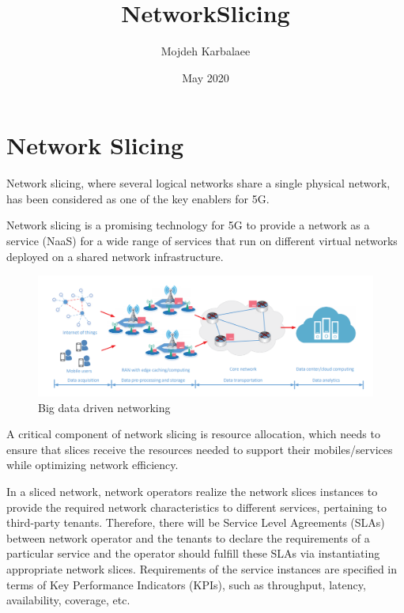 \documentclass{article}
\title{NetworkSlicing}
\author{Mojdeh Karbalaee}
\date{May 2020}
\begin{document}
\maketitle

\section{Network Slicing}
Network slicing, where several logical
networks share a single physical network, has been considered as one of
the key enablers for 5G. 

Network slicing is a promising technology for
5G to provide a network as a service (NaaS) for a wide range of
services that run on different virtual networks deployed on a
shared network infrastructure. 
\begin{figure}[h!]
\centering
\includegraphics[scale=0.4]{Capture1.PNG}
\caption{ Big data driven networking}
\label{fig:Bigdata}
\end{figure}
A critical component of network slicing is resource allocation, which needs
to ensure that slices receive the resources needed to support their mobiles/services while optimizing network efficiency.

In a sliced network, network operators
realize the network slices instances to provide the required
network characteristics to different services, pertaining to
third-party tenants.
 Therefore, there will be Service Level
Agreements (SLAs) between network operator and the tenants
to declare the requirements of a particular service and the
operator should fulfill these SLAs via instantiating appropriate
network slices. Requirements of the service instances are
specified in terms of Key Performance Indicators (KPIs), such
as throughput, latency, availability, coverage, etc.
\end{document}

